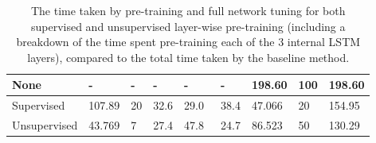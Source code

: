 \documentclass[a4paper, 11pt]{report}
\begin{document}
\begin{table}[ht]
\begin{tabular}{|l|l|l|l|l|l|l|l|l|}
        None                                                                             & -                                                                                             & -                                                                                                                    & -                                                                         & -                                                                        & -                                                                        & 198.60                                                                                  & 100                                                                      & 198.60                                                                                  \\ 
        \hline
        Supervised                                                                       & 107.89                                                                                        & 20                                                                                                                   & 32.6                                                                      & 29.0                                                                     & 38.4                                                                     & 47.066                                                                                  & 20                                                                       & 154.95                                                                                  \\ 
        \hline
        Unsupervised                                                                     & 43.769                                                                                        & 7                                                                                                                    & 27.4                                                                      & 47.8~                                                                    & 24.7                                                                     & 86.523                                                                                  & 50                                                                       & 130.29                                                                                  \\
        \hline
        \end{tabular}
        \caption{\centering The time taken by pre-training and full network tuning for both supervised and unsupervised layer-wise pre-training (including a breakdown of the time spent pre-training each of the 3 internal LSTM layers), compared to the total time taken by the baseline method.}
        \label{table: progressive-efficiency}
    \end{table}
\end{document}
